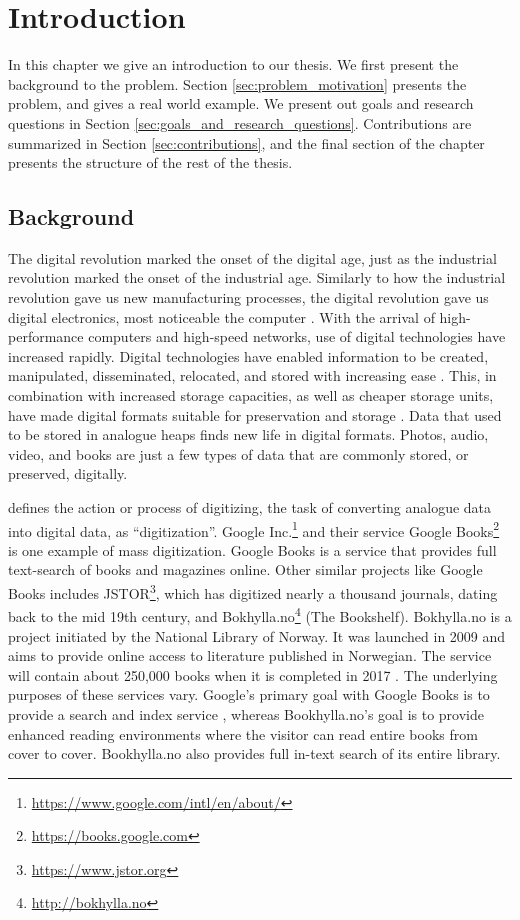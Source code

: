 
\chapter{Introduction}
\label{ch:introduction}
In this chapter we give an introduction to our thesis. We first present the background to the problem. Section \ref{sec:problem_motivation} presents the problem, and gives a real world example. We present out goals and research questions in Section \ref{sec:goals_and_research_questions}. Contributions are summarized in Section \ref{sec:contributions}, and the final section of the chapter presents the structure of the rest of the thesis.

\section{Background}
The digital revolution marked the onset of the digital age, just as the industrial revolution marked the onset of the industrial age. Similarly to how the industrial revolution gave us new manufacturing processes, the digital revolution gave us digital electronics, most noticeable the computer \citep{freeman2001time}. With the arrival of high-performance computers and high-speed networks, use of digital technologies have increased rapidly. Digital technologies have enabled information to be created, manipulated, disseminated, relocated, and stored with increasing ease \citep{lee2002state}. This, in combination with increased storage capacities, as well as cheaper storage units, have made digital formats suitable for preservation and storage \citep{morris2003evolution}. Data that used to be stored in analogue heaps finds new life in digital formats. Photos, audio, video, and books are just a few types of data that are commonly stored, or preserved, digitally.

\cite{misc-oed-digitization} defines the action or process of digitizing, the task of converting analogue data into digital data, as ``digitization''. Google Inc.\footnote{\url{https://www.google.com/intl/en/about/}} and their service Google Books\footnote{\url{https://books.google.com}} is one example of mass digitization. Google Books is a service that provides full text-search of books and magazines online. Other similar projects like Google Books includes JSTOR\footnote{\url{https://www.jstor.org}}, which has digitized nearly a thousand journals, dating back to the mid 19th century, and Bokhylla.no\footnote{\url{http://bokhylla.no}} (The Bookshelf). Bokhylla.no is a project initiated by the National Library of Norway. It was launched in 2009 and aims to provide online access to literature published in Norwegian. The service will contain about 250,000 books when it is completed in 2017 \citep{misc-nb-digial-library}. The underlying purposes of these services vary. Google's primary goal with Google Books is to provide a search and index service \citep{coyle2006mass}, whereas Bookhylla.no's goal is to provide enhanced reading environments where the visitor can read entire books from cover to cover. Bookhylla.no also provides full in-text search of its entire library. 

